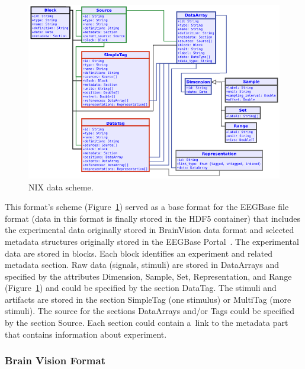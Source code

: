 \documentclass[conference]{IEEEtran}
\begin{document}
\begin{figure}[h]
	\centering
	\includegraphics[scale=0.9]{obrazky/NIX_scheme.png}
	\caption{NIX data scheme. \cite{pandora}}
	\label{NIX_scheme}
\end{figure}


This format's scheme (Figure~\ref{NIX_scheme}) served as a base format for the EEGBase file format (data in this format is finally stored in the HDF5 container) that includes the experimental data originally stored in BrainVision data format and selected metadata structures originally stored in the EEGBase Portal~\cite{eegportal}. The experimental data are stored in blocks. Each block identifies an experiment and related metadata section. Raw data (signals, stimuli) are stored in DataArrays and specified by the attributes Dimension, Sample, Set, Representation, and Range (Figure~\ref{NIX_scheme}) and could be specified by the section DataTag. The stimuli and artifacts are stored in the section SimpleTag (one stimulus) or MultiTag (more stimuli). The source for the sections DataArrays and/or Tags could be specified by the section Source. Each section could contain a~link to the metadata part that contains information about experiment.

\subsubsection{Brain Vision Format}
\end{document}
